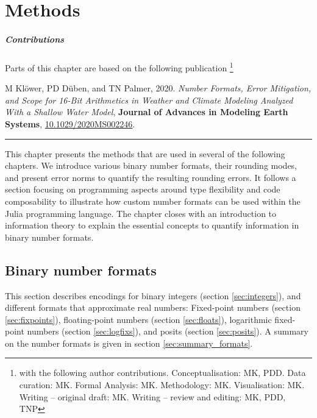 \chapter{Methods}
\label{chap:methods}

\small \paragraph{Contributions} Parts of this chapter are based on the following publication \footnote{with the following author contributions.
Conceptualisation: MK, PDD. Data curation: MK. Formal Analysis: MK. Methodology: MK. Visualisation: MK. Writing – original draft:
MK. Writing – review and editing: MK, PDD, TNP}

\vspace{\baselineskip}
\indent M Klöwer, PD Düben, and TN Palmer, 2020. \emph{Number Formats, Error Mitigation, and Scope for 16-Bit Arithmetics in Weather and
Climate Modeling Analyzed With a Shallow Water Model}, \textbf{Journal of Advances in Modeling Earth Systems},
\href{https://doi.org/10.1029/2020MS002246}{10.1029/2020MS002246}.
\vspace{\baselineskip}
\hrule
\vspace{\baselineskip}

This chapter presents the methods that are used in several of the following chapters. We introduce various binary number formats,
their rounding modes, and present error norms to quantify the resulting rounding errors. It follows a section focusing on
programming aspects around type flexibility and code composability to illustrate how custom number formats can be used within
the Julia programming language. The chapter closes with an introduction to information theory to explain the essential concepts
to quantify information in binary number formats.

\section{Binary number formats}
\label{sec:numbers}

This section describes encodings for binary integers (section \ref{sec:integers}), and different formats that approximate real numbers:
Fixed-point numbers (section \ref{sec:fixpoints}), floating-point numbers (section \ref{sec:floats}), logarithmic fixed-point numbers
(section \ref{sec:logfixs}), and posits (section \ref{sec:posits}). A summary on the number formats is given in section \ref{sec:summary_formats}.

